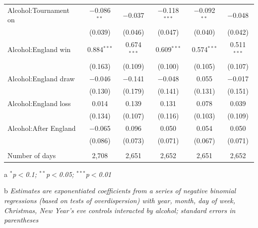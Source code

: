 \documentclass[12pt, a4paper]{article}
\begin{document}
\begin{table}[htp]
{\begin{threeparttable}
\begin{tabular}{@{\extracolsep{5pt}}lccccc}
  Alcohol:Tournament on & $-$0.086$^{**}$ & $-$0.037 & $-$0.118$^{***}$ & $-$0.092$^{**}$ & $-$0.048 \\ 
  & (0.039) & (0.046) & (0.047) & (0.040) & (0.042) \\ 
  Alcohol:England win & 0.884$^{***}$ & 0.674$^{***}$ & 0.609$^{***}$ & 0.574$^{***}$ & 0.511$^{***}$ \\ 
  & (0.163) & (0.109) & (0.100) & (0.105) & (0.107) \\ 
  Alcohol:England draw & $-$0.046 & $-$0.141 & $-$0.048 & 0.055 & $-$0.017 \\ 
  & (0.130) & (0.179) & (0.141) & (0.131) & (0.151) \\ 
  Alcohol:England loss & 0.014 & 0.139 & 0.131 & 0.078 & 0.039 \\ 
  & (0.134) & (0.107) & (0.116) & (0.103) & (0.109) \\ 
  Alcohol:After England & $-$0.065 & 0.096 & 0.050 & 0.054 & 0.050 \\ 
  & (0.086) & (0.073) & (0.071) & (0.067) & (0.071) \\ 
 \hline \\[-1.8ex] 
Number of days & 2,708 & 2,651 & 2,652 & 2,651 & 2,652 \\ 
\hline 

\end{tabular}
\begin{tablenotes}
      \item[a] \textit{$^{*}$p$<$0.1; $^{**}$p$<$0.05; $^{***}$p$<$0.01}
      \item[b] \textit{Estimates are exponentiated coefficients from a series of negative binomial regressions (based on tests of overdispersion)  with year, month, day of week, Christmas, New Year's eve controls interacted by alcohol; standard errors in parentheses}
    \end{tablenotes}
\end{threeparttable} } 
\end{table}
\end{document}
